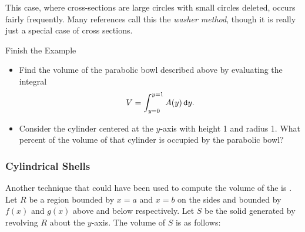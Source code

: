This case, where cross-sections are large circles with small circles deleted, occurs fairly frequently.  Many references call this the \emph{washer method}, though it is really just a special case of cross sections.
 
\begin{exercise}{Finish the Example \Coffeecup}\label{ParaBowla}
\begin{itemize}\item Find the volume of the parabolic bowl described above by evaluating the integral $$V=\int_{y=0}^{y=1}A(y)\mathop{}\!\mathtt{d} y. $$

\item Consider the cylinder centered at the $y$-axis with height 1 and radius 1.  What percent of the volume of that cylinder is occupied by the parabolic bowl? 


\end{itemize}
\end{exercise}

\subsubsection{Cylindrical Shells}

Another technique that could have been used to compute the volume of the  is . Let $R$ be a region bounded by $x=a$ and $x=b$ on the sides and bounded by $f(x)$ and $g(x)$ above and below respectively.  Let $S$ be the solid generated by revolving $R$ about the $y$-axis.  The volume of $S$ is as follows:   



